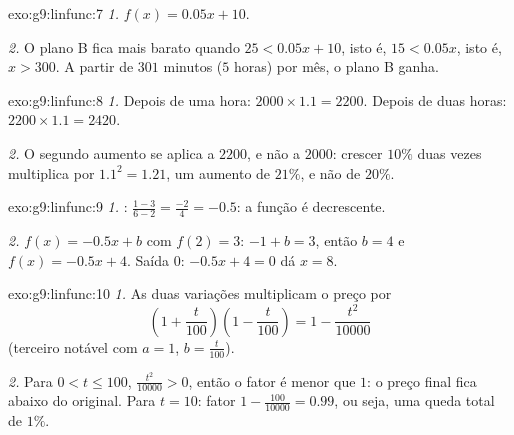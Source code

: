 \begin{solution}{exo:g9:linfunc:7}
\emph{1.} $f(x) = 0.05x + 10$.

\emph{2.} O plano B fica mais barato quando $25 < 0.05x + 10$, isto é,
$15 < 0.05x$, isto é, $x > 300$. A partir de $301$ minutos ($5$ horas)
por mês, o plano B ganha.
\end{solution}

\begin{solution}{exo:g9:linfunc:8}
\emph{1.} Depois de uma hora: $2000 \times 1.1 = 2200$. Depois de duas
horas: $2200 \times 1.1 = 2420$.

\emph{2.} O segundo aumento se aplica a $2200$, e não a $2000$: crescer
$10\%$ duas vezes multiplica por $1.1^2 = 1.21$, um aumento de $21\%$,
e não de $20\%$.
\end{solution}

\begin{solution}{exo:g9:linfunc:9}
\emph{1.} : $\frac{1 - 3}{6 - 2} = \frac{-2}{4} =
-0.5$: a função é decrescente.

\emph{2.} $f(x) = -0.5x + b$ com $f(2) = 3$: $-1 + b = 3$, então
$b = 4$ e $f(x) = -0.5x + 4$. Saída $0$: $-0.5x + 4 = 0$ dá $x = 8$.
\end{solution}

\begin{solution}{exo:g9:linfunc:10}
\emph{1.} As duas variações multiplicam o preço por
\[
\left(1 + \frac{t}{100}\right)\left(1 - \frac{t}{100}\right)
= 1 - \frac{t^2}{10000}
\]
(terceiro  notável com $a = 1$, $b = \frac{t}{100}$).

\emph{2.} Para $0 < t \leq 100$, $\frac{t^2}{10000} > 0$, então o fator
é menor que $1$: o preço final fica abaixo do original. Para $t = 10$:
fator $1 - \frac{100}{10000} = 0.99$, ou seja, uma queda total de
$1\%$.
\end{solution}

